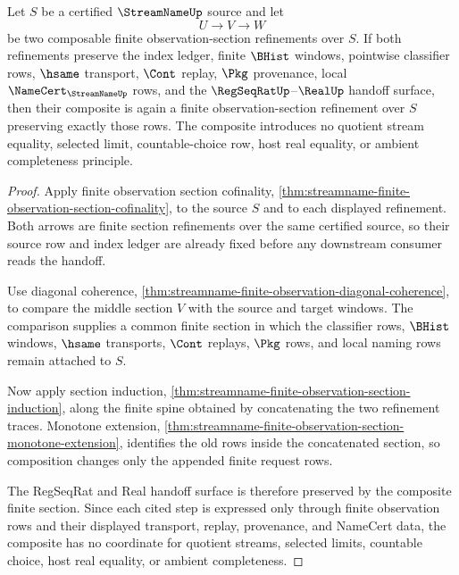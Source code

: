 \begin{theorem}
\label{thm:streamname-finite-observation-section-functoriality}
Let $S$ be a certified $\StreamNameUp$ source and let
$$
U \longrightarrow V \longrightarrow W
$$
be two composable finite observation-section refinements over $S$. If both refinements preserve the index ledger, finite $\BHist$ windows, pointwise classifier rows, $\hsame$ transport, $\Cont$ replay, $\Pkg$ provenance, local $\NameCert_{\StreamNameUp}$ rows, and the $\RegSeqRatUp$--$\RealUp$ handoff surface, then their composite is again a finite observation-section refinement over $S$ preserving exactly those rows. The composite introduces no quotient stream equality, selected limit, countable-choice row, host real equality, or ambient completeness principle.
\end{theorem}
\begin{proof}
Apply finite observation section cofinality, \autoref{thm:streamname-finite-observation-section-cofinality}, to the source $S$ and to each displayed refinement. Both arrows are finite section refinements over the same certified source, so their source row and index ledger are already fixed before any downstream consumer reads the handoff.

Use diagonal coherence, \autoref{thm:streamname-finite-observation-diagonal-coherence}, to compare the middle section $V$ with the source and target windows. The comparison supplies a common finite section in which the classifier rows, $\BHist$ windows, $\hsame$ transports, $\Cont$ replays, $\Pkg$ rows, and local naming rows remain attached to $S$.

Now apply section induction, \autoref{thm:streamname-finite-observation-section-induction}, along the finite spine obtained by concatenating the two refinement traces. Monotone extension, \autoref{thm:streamname-finite-observation-section-monotone-extension}, identifies the old rows inside the concatenated section, so composition changes only the appended finite request rows.

The RegSeqRat and Real handoff surface is therefore preserved by the composite finite section. Since each cited step is expressed only through finite observation rows and their displayed transport, replay, provenance, and NameCert data, the composite has no coordinate for quotient streams, selected limits, countable choice, host real equality, or ambient completeness.
\end{proof}

